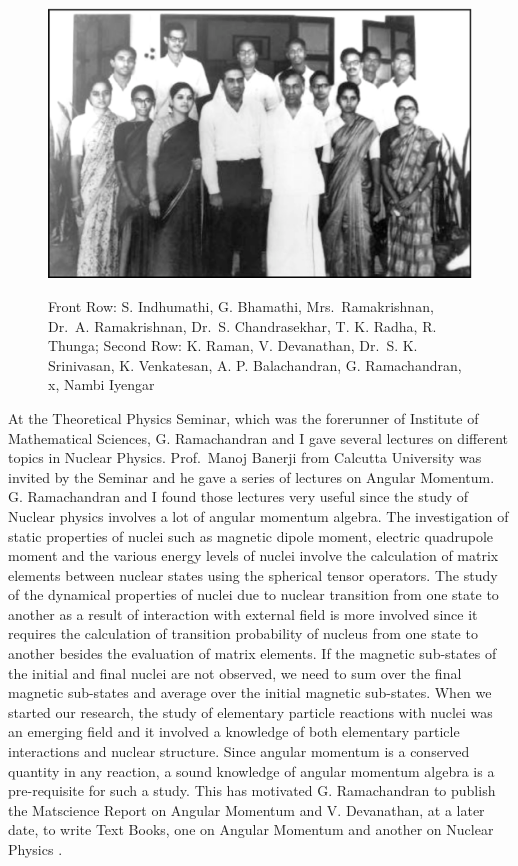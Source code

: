 \begin{figure}[H]
\centering
\includegraphics[scale=.35]{src/images/chap3/chap3-fig3.eps}\\
\caption{Front Row: S. Indhumathi, G. Bhamathi, Mrs.\ Ramakrishnan, Dr.\ A. Ramakrishnan, Dr.\ S. Chandrasekhar, T. K. Radha, R. Thunga;
Second Row: K. Raman, V. Devanathan, Dr.\ S. K. Srinivasan, K. Venkatesan, A. P. Balachandran, G. Ramachandran, x, Nambi Iyengar}
\end{figure}

At the Theoretical Physics Seminar, which was the forerunner of Institute of Mathematical Sciences, G. Ramachandran and I gave several lectures on different topics in Nuclear Physics. Prof.\ Manoj Banerji from Calcutta University was invited by the Seminar and he gave a series of lectures on Angular Momentum. G. Ramachandran and I found those lectures very useful since the study of Nuclear physics involves a lot of angular momentum algebra. The investigation of static properties of nuclei such as magnetic dipole moment, electric quadrupole moment and the various energy levels of nuclei involve the calculation of matrix elements between nuclear states using the spherical tensor operators. The study of the dynamical properties of nuclei due to nuclear transition from one state to another as a result of interaction with external field is more involved since it requires the calculation of transition probability of nucleus from one state to another besides the evaluation of matrix elements. If the magnetic sub-states of the initial and final nuclei are not observed, we need to sum over the final magnetic sub-states and average over the initial magnetic sub-states. When we started our research, the study of elementary particle reactions with nuclei was an emerging field and it involved a knowledge of both elementary particle interactions and nuclear structure. Since angular momentum is a conserved quantity in any reaction, a sound knowledge of angular momentum algebra is a pre-requisite for such a study. This has motivated G. Ramachandran to publish the Matscience Report on Angular Momentum \cite{chap3-key10} and V. Devanathan, at a later date, to write Text Books, one on Angular Momentum \cite{chap3-key11} and another on Nuclear Physics \cite{chap3-key12}.


